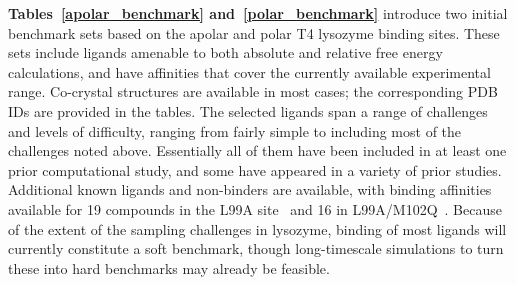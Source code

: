 \documentclass[aps,pre,twocolumn,nofootinbib,superscriptaddress,10pt, final,tightenlines]{revtex4-1}
\begin{document}
{\bf Tables~\ref{apolar_benchmark} and~\ref{polar_benchmark}} introduce two initial benchmark sets based on the apolar and polar T4 lysozyme binding sites. 
These sets include ligands amenable to both absolute and relative free energy calculations, and have affinities that cover the currently available experimental range.
Co-crystal structures are available in most cases; the corresponding PDB IDs are provided in the tables. 
The selected ligands span a range of challenges and levels of difficulty, ranging from fairly simple to including most of the challenges noted above. 
Essentially all of them have been included in at least one prior computational study, and some have appeared in a variety of prior studies.
Additional known ligands and non-binders are available, with binding affinities available for 19 compounds in the L99A site~\cite{eriksson_cavity-containing_1992, morton_energetic_1995, mobley_predicting_2007} and 16 in L99A/M102Q~\cite{wei_model_2002, graves_decoys_2005, boyce_predicting_2009}. 
Because of the extent of the sampling challenges in lysozyme, binding of most ligands will currently constitute a soft benchmark, though long-timescale simulations to turn these into hard benchmarks may already be feasible.
\end{document}
